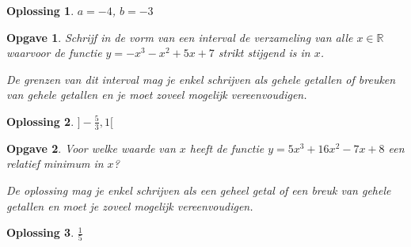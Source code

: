 \documentclass{article}
\newtheorem{opgave}{Opgave}
\newtheorem*{oplossing}{Oplossing}
\begin{document}
\begin{oplossing}
$a=-4$, $b=-3$
\end{oplossing}

\begin{opgave}
Schrijf in de vorm van een interval de verzameling van alle $x\in \mathbb{R}$ waarvoor de functie $y=-x^3-x^2+5x+7$ strikt stijgend is in $x$.\vspace{1mm}

\noindent De grenzen van dit interval mag je enkel schrijven als gehele getallen of breuken van gehele getallen en je moet zoveel mogelijk vereenvoudigen.


\end{opgave}

\begin{oplossing}
$]-\frac{5}{3},1[$
\end{oplossing}

\begin{opgave}
Voor welke waarde van $x$ heeft de functie $y=5x^3+16x^2-7x+8$ een relatief minimum in $x$?\vspace{2mm}

\noindent De oplossing mag je enkel schrijven als een geheel getal of een breuk van gehele getallen en moet je zoveel mogelijk vereenvoudigen.
\end{opgave}

\begin{oplossing}
$\frac{1}{5}$
\end{oplossing}
\end{document}
